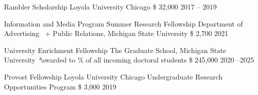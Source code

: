 \begin{cvhonors}

  \cvhonor
    {Rambler Scholarship} %
    { Loyola University Chicago
} %
    {\$ 32,000} %
    {2017 -- 2019} %
\end{cvhonors}


\begin{cvhonors}
  \cvhonor
    {Information and Media Program Summer Research Fellowship} 
    {Department of Advertising \ +  Public Relations,
    Michigan State University } 
    {\$ 2,700} 
    {2021} 

  \cvhonor
    {University Enrichment Fellowship} %
    {The Graduate School, Michigan State University \scriptsize{\textit{*}awarded to  \% of all incoming doctoral students}} %
    {\$ 245,000} %
    {2020 --2025} %
    
  \cvhonor
    {Provost Fellowship} 
    {Loyola University Chicago Undergraduate Research Opportunities Program } 
    {\$ 3,000} 
    {2019} 
\end{cvhonors}
